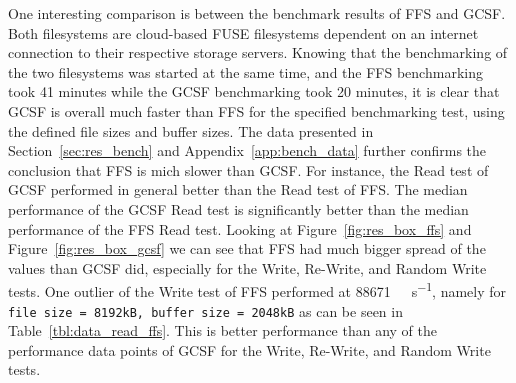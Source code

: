 One interesting comparison is between the benchmark results of \gls{FFS} and \gls{GCSF}. Both filesystems are \mbox{cloud-based} \gls{FUSE} filesystems dependent on an internet connection to their respective storage servers. Knowing that the benchmarking of the two filesystems was started at the same time, and the \gls{FFS} benchmarking took 41 minutes while the \gls{GCSF} benchmarking took 20 minutes, it is clear that \gls{GCSF} is overall much faster than \gls{FFS} for the specified benchmarking test, using the defined file sizes and buffer sizes. The data presented in Section~\ref{sec:res_bench} and Appendix~\ref{app:bench_data} further confirms the conclusion that \gls{FFS} is mich slower than \gls{GCSF}. For instance, the Read test of \gls{GCSF} performed in general better than the Read test of \gls{FFS}. The median performance of the \gls{GCSF} Read test is significantly better than the median performance of the \gls{FFS} Read test. Looking at Figure~\ref{fig:res_box_ffs} and Figure~\ref{fig:res_box_gcsf} we can see that \gls{FFS} had much bigger spread of the values than \gls{GCSF} did, especially for the Write, \mbox{Re-Write}, and Random Write tests. One outlier of the Write test of \gls{FFS} performed at \SI[per-mode = symbol]{88671}{\kilo\byte\per\second}, namely for \texttt{file size = 8192kB, buffer size = 2048kB} as can be seen in Table~\ref{tbl:data_read_ffs}. This is better performance than any of the performance data points of \gls{GCSF} for the Write, \mbox{Re-Write}, and Random Write tests.

